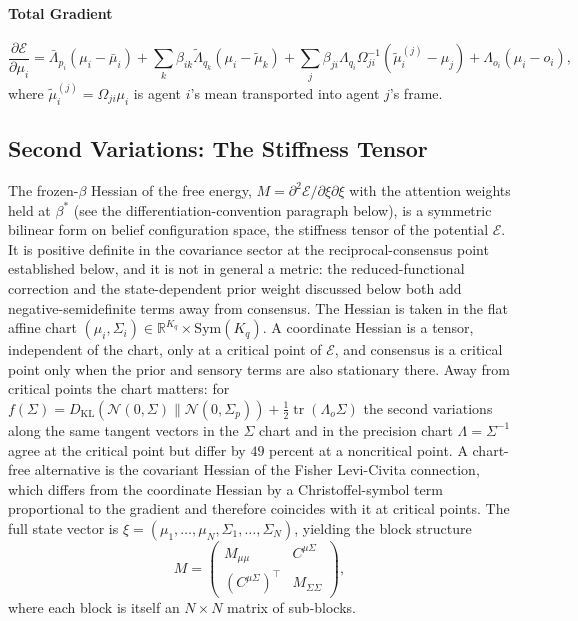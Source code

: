 \paragraph{Total Gradient}
\begin{equation}
\frac{\partial \mathcal{E}}{\partial \mu_i} = \bar{\Lambda}_{p_i}(\mu_i - \bar{\mu}_i) + \sum_k \beta_{ik}\tilde{\Lambda}_{q_k}(\mu_i - \tilde{\mu}_k) + \sum_j \beta_{ji}\Lambda_{q_i}\Omega_{ji}^{-1}(\tilde{\mu}_i^{(j)} - \mu_j) + \Lambda_{o_i}(\mu_i - o_i),
\label{eq:total_gradient_mu}
\end{equation}
where $\tilde{\mu}_i^{(j)} = \Omega_{ji}\mu_i$ is agent $i$'s mean transported into agent $j$'s frame.

\subsection{Second Variations: The Stiffness Tensor}

The frozen-$\beta$ Hessian of the free energy, $M = \partial^2 \mathcal{E}/\partial\xi\partial\xi$ with the attention weights held at $\beta^*$ (see the differentiation-convention paragraph below), is a symmetric bilinear form on belief configuration space, the stiffness tensor of the potential $\mathcal{E}$. It is positive definite in the covariance sector at the reciprocal-consensus point established below, and it is not in general a metric: the reduced-functional correction and the state-dependent prior weight discussed below both add negative-semidefinite terms away from consensus. The Hessian is taken in the flat affine chart $(\mu_i, \Sigma_i) \in \mathbb{R}^{K_q} \times \mathrm{Sym}(K_q)$. A coordinate Hessian is a tensor, independent of the chart, only at a critical point of $\mathcal{E}$, and consensus is a critical point only when the prior and sensory terms are also stationary there. Away from critical points the chart matters: for $f(\Sigma) = D_{\mathrm{KL}}(\mathcal{N}(0,\Sigma)\|\mathcal{N}(0,\Sigma_p)) + \tfrac12\operatorname{tr}(\Lambda_o\Sigma)$ the second variations along the same tangent vectors in the $\Sigma$ chart and in the precision chart $\Lambda = \Sigma^{-1}$ agree at the critical point but differ by $49$ percent at a noncritical point. A chart-free alternative is the covariant Hessian of the Fisher Levi-Civita connection, which differs from the coordinate Hessian by a Christoffel-symbol term proportional to the gradient and therefore coincides with it at critical points. The full state vector is $\xi = (\mu_1, \ldots, \mu_N, \Sigma_1, \ldots, \Sigma_N)$, yielding the block structure
\begin{equation}
M = \begin{pmatrix} M_{\mu\mu} & C^{\mu\Sigma} \\ (C^{\mu\Sigma})^\top & M_{\Sigma\Sigma} \end{pmatrix},
\label{eq:mass_block_structure}
\end{equation}
where each block is itself an $N \times N$ matrix of sub-blocks.

